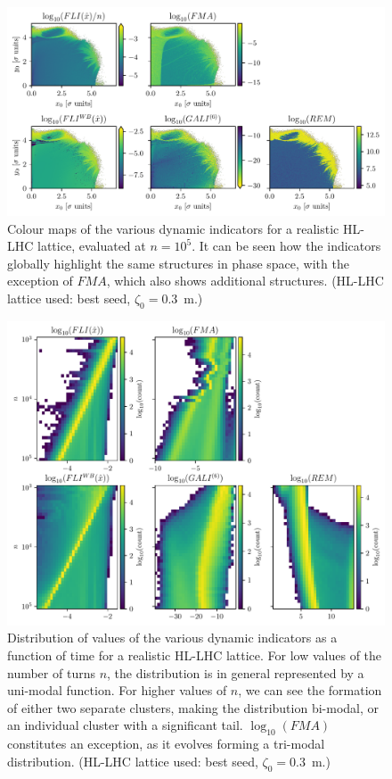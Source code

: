 \begin{figure}
    \centering
    \includegraphics[width=1.0\textwidth]{6_lhc_dynamic_indicators/figs/overview.pdf}
    \caption{Colour maps of the various dynamic indicators for a realistic HL-LHC lattice, evaluated at $n=10^5$. It can be seen how the indicators globally highlight the same structures in phase space, with the exception of $FMA$, which also shows additional structures. (HL-LHC lattice used: best seed, $\zeta_0=$\SI{0.3}{\meter}.)}
    \label{fig:overview}
\end{figure}

\begin{figure}
    \centering
    \includegraphics[width=1.0\textwidth]{6_lhc_dynamic_indicators/figs/evolution.pdf}
    \caption{Distribution of values of the various dynamic indicators as a function of time for a realistic HL-LHC lattice. For low values of the number of turns $n$, the distribution is in general represented by a uni-modal function. For higher values of $n$, we can see the formation of either two separate clusters, making the distribution bi-modal, or an individual cluster with a significant tail. $\log_{10}(FMA)$ constitutes an exception, as it evolves forming a tri-modal distribution. (HL-LHC lattice used: best seed, $\zeta_0=$\SI{0.3}{\meter}.)}
    \label{fig:overview2}
\end{figure}

